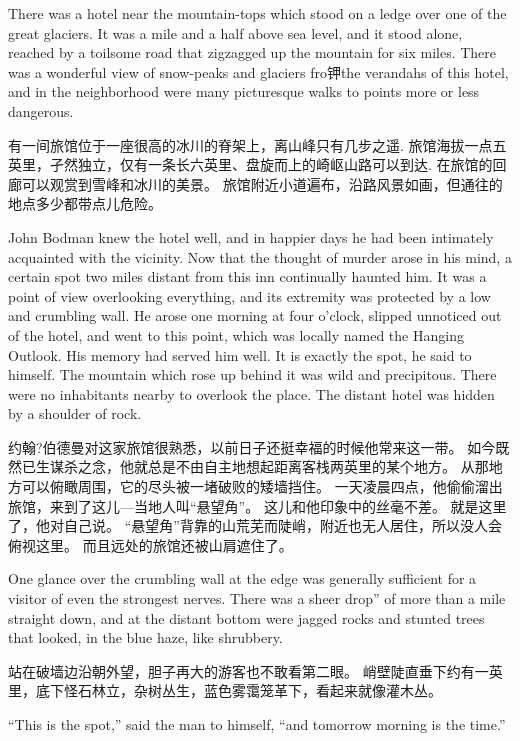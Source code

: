 \documentclass[cs4size, a4paper, 12pt]{article}
\newcounter{numpar}
\newcommand*{\newpar}{\numpar{}}
\begin{document}
	\newpar There was a hotel near the mountain-tops which stood on a ledge over one of the great glaciers. It was a mile and a half above sea level, and it stood alone, reached by a toilsome road that zigzagged up the mountain for six miles. There was a wonderful view of snow-peaks and glaciers fro钾the verandahs of this hotel, and in the neighborhood were many picturesque walks to points more or less dangerous.
	
	有一间旅馆位于一座很高的冰川的脊架上，离山峰只有几步之遥. 旅馆海拔一点五英里，孑然独立，仅有一条长六英里、盘旋而上的崎岖山路可以到达. 在旅馆的回廊可以观赏到雪峰和冰川的美景。 旅馆附近小道遍布，沿路风景如画，但通往的地点多少都带点儿危险。 
	
	\newpar John Bodman knew the hotel well, and in happier days he had been intimately acquainted with the vicinity. Now that the thought of murder arose in his mind, a certain spot two miles distant from this inn continually haunted him. It was a point of view overlooking everything, and its extremity was protected by a low and crumbling wall. He arose one morning at four o'clock, slipped unnoticed out of the hotel, and went to this point, which was locally named the Hanging Outlook. His memory had served him well. It is exactly the spot, he said to himself. The mountain which rose up behind it was wild and precipitous. There were no inhabitants nearby to overlook the place. The distant hotel was hidden by a shoulder of rock.
	
	约翰?伯德曼对这家旅馆很熟悉，以前日子还挺幸福的时候他常来这一带。 如今既然已生谋杀之念，他就总是不由自主地想起距离客栈两英里的某个地方。 从那地方可以俯瞰周围，它的尽头被一堵破败的矮墙挡住。 一天凌晨四点，他偷偷溜出旅馆，来到了这儿—当地人叫``悬望角''。 这儿和他印象中的丝毫不差。 就是这里了，他对自己说。 ``悬望角''背靠的山荒芜而陡峭，附近也无人居住，所以没人会俯视这里。 而且远处的旅馆还被山肩遮住了。 
	
	\newpar One glance over the crumbling wall at the edge was generally sufficient for a visitor of even the strongest nerves. There was a sheer drop'' of more than a mile straight down, and at the distant bottom were jagged rocks and stunted trees that looked, in the blue haze, like shrubbery.
	
	站在破墙边沿朝外望，胆子再大的游客也不敢看第二眼。 峭壁陡直垂下约有一英里，底下怪石林立，杂树丛生，蓝色雾霭笼革下，看起来就像灌木丛。 
	
	\newpar ``This is the spot,'' said the man to himself, ``and tomorrow morning is the time.''
	
\end{document}
